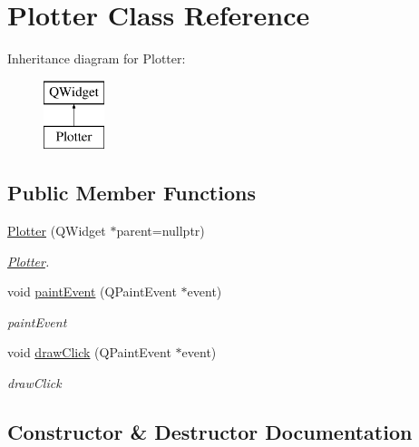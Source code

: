 \hypertarget{classPlotter}{}\section{Plotter Class Reference}
\label{classPlotter}
Inheritance diagram for Plotter\+:\begin{figure}[H]
\begin{center}
\leavevmode
\includegraphics[height=2.000000cm]{classPlotter}
\end{center}
\end{figure}
\subsection*{Public Member Functions}
\begin{DoxyCompactItemize}
\item 
\mbox{\hyperlink{classPlotter_a1807627530de30ae58dff3c42a823497}{Plotter}} (Q\+Widget $\ast$parent=nullptr)
\begin{DoxyCompactList}\small\item\em \mbox{\hyperlink{classPlotter}{Plotter}}. \end{DoxyCompactList}\item 
void \mbox{\hyperlink{classPlotter_a06477bf987646f000a8982db1352a11d}{paint\+Event}} (Q\+Paint\+Event $\ast$event)
\begin{DoxyCompactList}\small\item\em paint\+Event \end{DoxyCompactList}\item 
void \mbox{\hyperlink{classPlotter_a237062ad0a0bd6462afd77ff111122b5}{draw\+Click}} (Q\+Paint\+Event $\ast$event)
\begin{DoxyCompactList}\small\item\em draw\+Click \end{DoxyCompactList}\end{DoxyCompactItemize}


\subsection{Constructor \& Destructor Documentation}
\mbox{\label{classPlotter_a1807627530de30ae58dff3c42a823497}} 
